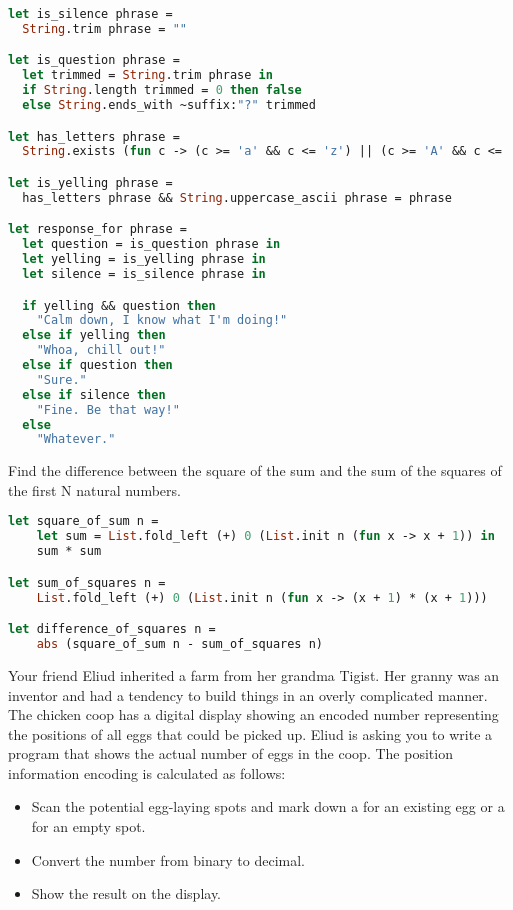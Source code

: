 \begin{lstlisting}[language=OCaml]
let is_silence phrase =
  String.trim phrase = ""

let is_question phrase =
  let trimmed = String.trim phrase in
  if String.length trimmed = 0 then false
  else String.ends_with ~suffix:"?" trimmed

let has_letters phrase =
  String.exists (fun c -> (c >= 'a' && c <= 'z') || (c >= 'A' && c <= 'Z')) phrase

let is_yelling phrase =
  has_letters phrase && String.uppercase_ascii phrase = phrase

let response_for phrase =
  let question = is_question phrase in
  let yelling = is_yelling phrase in
  let silence = is_silence phrase in

  if yelling && question then
    "Calm down, I know what I'm doing!"
  else if yelling then
    "Whoa, chill out!"
  else if question then
    "Sure."
  else if silence then
    "Fine. Be that way!"
  else
    "Whatever."
\end{lstlisting}

Find the difference between the square of the sum and the sum of the squares of the first N natural numbers.

\begin{lstlisting}[language=OCaml]
let square_of_sum n = 
    let sum = List.fold_left (+) 0 (List.init n (fun x -> x + 1)) in
    sum * sum

let sum_of_squares n =
    List.fold_left (+) 0 (List.init n (fun x -> (x + 1) * (x + 1)))

let difference_of_squares n =
    abs (square_of_sum n - sum_of_squares n)
\end{lstlisting}

Your friend Eliud inherited a farm from her grandma Tigist.
Her granny was an inventor and had a tendency to build things in an overly complicated manner.
The chicken coop has a digital display showing an encoded number representing the positions of all eggs that could be picked up.
Eliud is asking you to write a program that shows the actual number of eggs in the coop.
The position information encoding is calculated as follows:

\begin{itemize}
  \item Scan the potential egg-laying spots and mark down a  for an existing egg or a  for an empty spot.
  \item Convert the number from binary to decimal.
  \item Show the result on the display.
\end{itemize}

